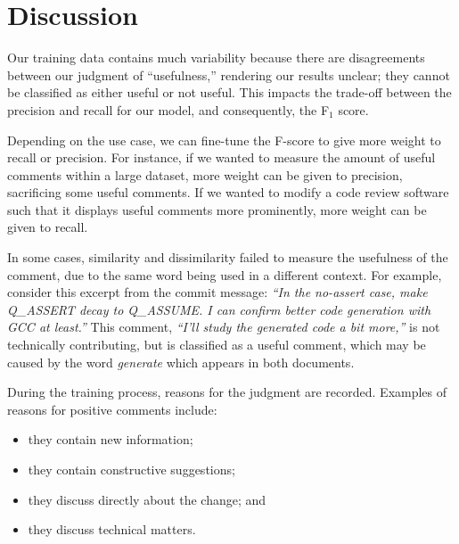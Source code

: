 \section{Discussion}

Our training data contains much variability because there are disagreements between our judgment of ``usefulness,'' rendering our results unclear; they cannot be classified as either useful or not useful.
This impacts the trade-off between the precision and recall for our model, and consequently, the F$_1$ score.

Depending on the use case, we can fine-tune the F-score to give more weight to recall or precision.
For instance, if we wanted to measure the amount of useful comments within a large dataset, more weight can be given to precision, sacrificing some useful comments.
If we wanted to modify a code review software such that it displays useful comments more prominently, more weight can be given to recall.

In some cases, similarity and dissimilarity failed to measure the usefulness of the comment,
due to the same word being used in a different context.
For example, consider this excerpt from the commit message: \emph{``In the no-assert case, make Q\_ASSERT decay to Q\_ASSUME. I can confirm
better code generation with GCC at least.''}
This comment, \emph{``I'll study the generated code a bit more,''} is not technically contributing, but is classified as a useful comment, which may be caused by the word \emph{generate} which appears in both documents.

During the training process, reasons for the judgment are recorded. Examples of reasons for positive comments include:

\begin{itemize}
	\item they contain new information;
	\item they contain constructive suggestions;
	\item they discuss directly about the change; and
	\item they discuss technical matters.
\end{itemize}

